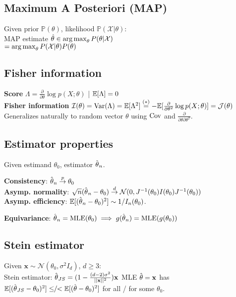 \subsection*{Maximum A Posteriori (MAP)}
Given prior $\mathbb{P}(\theta)$, likelihood $\mathbb{P}(\mathcal{X}|\theta)$:\\  MAP estimate $\hat{\theta}\in \operatorname*{arg\,max}_\theta P(\theta|\mathcal{X})$\\ $=\operatorname*{arg\,max}_\theta P(\mathcal{X}|\theta)P(\theta)$\\

\subsection*{Fisher information}
\textbf{Score} $\Lambda = \frac{\partial}{\partial\theta} \log p(X;\theta)$ | $\mathbb{E}[\Lambda] = 0$\\
\textbf{Fisher information} $\mathcal{I}(\theta) = \mathrm{Var}(\Lambda) = \mathbb{E}[\Lambda^2] \overset{(*)}{=}
-\mathbb{E}[\frac{\partial}{\partial\theta^2} \log p(X;\theta)] = \mathcal{J}(\theta)$
Generalizes naturally to random vector $\mathbb{\theta}$ using $\mathrm{Cov}$ and $\frac{\partial}{\partial\theta\partial\theta^T}$.

\subsection*{Estimator properties}

Given estimand $\theta_0$, estimator $\hat{\kern0pt \theta}_n$.

\textbf{Consistency}: $\hat{\kern0pt \theta}_n \overset{p}{\to} \theta_0$\\
\textbf{Asymp. normality}: $\sqrt{n}(\hat{\kern0pt \theta}_n-\theta_0) \overset{d}{\to} \mathcal{N}(0, J^{-1}(\theta_0)I(\theta_0)J^{-1}(\theta_0))$\\
\textbf{Asymp. efficiency}:
$\mathbb{E}[(\hat{\kern0pt \theta}_n - \theta_0)^2]\sim 1/I_n(\theta_0)$.

\textbf{Equivariance}:
$\hat{\kern0pt \theta}_n = \textrm{MLE}(\theta_0) \implies g(\hat{\kern0pt \theta}_n) = \textrm{MLE}(g(\theta_0))$


\subsection*{Stein estimator}
Given $\mathbf{x} \sim \mathcal{N}(\theta_0, \sigma^2I_d)$, $d\geq3$:\\
Stein estimator: $\hat{\kern0pt \theta}_{JS} = (1-\frac{(d-2)\sigma^2}{||\mathbf{x}||^2})\mathbf{x}$
MLE $\hat{\kern0pt \theta} = \mathbf{x}$ has $\mathbb{E}[(\hat{\kern0pt \theta}_{JS} - \theta_0)^2] \leq\!\!/\!\!< \mathbb{E}[(\hat{\kern0pt \theta} - \theta_0)^2]$ for all / for some $\theta_0$.

